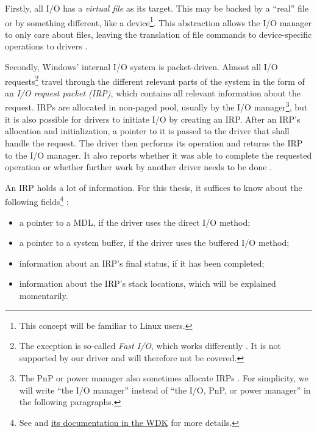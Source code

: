 Firstly, all I/O has a \emph{virtual file} as its target. This may be backed by a ``real'' file or by something different, like a device\footnote{\label{fn:background.kerneldriver.virtualfiles} This concept will be familiar to Linux users.}. This abstraction allows the I/O manager to only care about files, leaving the translation of file commands to device-specific operations to drivers \cite{Yosifovich2017}. 

Secondly, Windows' internal I/O system is packet-driven. Almost all I/O requests\footnote{\label{fn:background.kerneldriver.fastio} The exception is so-called \emph{Fast I/O}, which works differently \cite{Yosifovich2017}. It is not supported by our driver and will therefore not be covered.} travel through the different relevant parts of the system in the form of an \emph{I/O request packet (IRP)}, which contains all relevant information about the request. IRPs are allocated in non-paged pool, usually by the I/O manager\footnote{\label{fn:background.kerneldriver.irpallocation} The PnP or power manager also sometimes allocate IRPs \cite{Yosifovich2017}. For simplicity, we will write ``the I/O manager'' instead of ``the I/O, PnP, or power manager'' in the following paragraphs.}, but it is also possible for drivers to initiate I/O by creating an IRP. After an IRP's allocation and initialization, a pointer to it is passed to the driver that shall handle the request. The driver then performs its operation and returns the IRP to the I/O manager. It also reports whether it was able to complete the requested operation or whether further work by another driver needs to be done \cite{Yosifovich2017}.

An IRP holds a lot of information. For this thesis, it suffices to know about the following fields\footnote{\label{fn:background.kerneldriver.irp} See \cite{Yosifovich2017} and \href{https://docs.microsoft.com/en-us/windows-hardware/drivers/ddi/wdm/ns-wdm-_irp}{its documentation in the WDK} for more details.} \cite{Yosifovich2017}:
\begin{itemize}
	\item a pointer to a MDL, if the driver uses the direct I/O method;
	\item a pointer to a system buffer, if the driver uses the buffered I/O method;
	\item information about an IRP's final status, if it has been completed;
	\item information about the IRP's stack locations, which will be explained momentarily.
\end{itemize}

